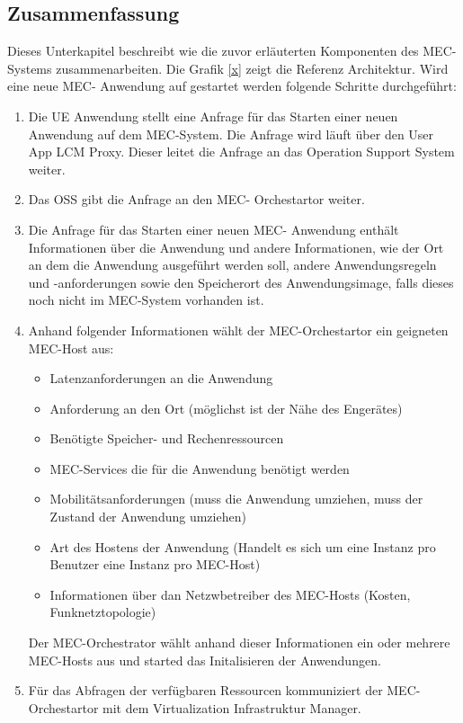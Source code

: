 \documentclass[runningheads]{llncs}
\numberwithin{figure}{section}
\begin{document}
\subsection{Zusammenfassung}
Dieses Unterkapitel beschreibt wie die zuvor erläuterten Komponenten des MEC-Systems zusammenarbeiten. Die Grafik \ref{x} zeigt die 
Referenz Architektur. Wird eine neue MEC- Anwendung auf gestartet werden folgende Schritte durchgeführt:
\begin{enumerate}
  \item Die UE Anwendung stellt eine Anfrage für das Starten einer neuen Anwendung auf dem MEC-System. Die Anfrage wird läuft über den 
  User App LCM Proxy. Dieser leitet die Anfrage an das Operation Support System weiter.
  \item Das OSS gibt die Anfrage an den MEC- Orchestartor weiter.
  \item Die Anfrage für das Starten einer neuen MEC- Anwendung enthält Informationen über 
  die Anwendung und andere Informationen, wie der Ort an dem die Anwendung ausgeführt werden soll, 
  andere Anwendungsregeln und -anforderungen sowie den Speicherort des Anwendungsimage, 
  falls dieses noch nicht im MEC-System vorhanden ist. 
  \item Anhand folgender Informationen wählt der MEC-Orchestartor ein geigneten MEC-Host aus:
  \begin{itemize}
    \item Latenzanforderungen an die Anwendung
    \item Anforderung an den Ort (möglichst ist der Nähe des Engerätes)
    \item Benötigte Speicher- und Rechenressourcen
    \item MEC-Services die für die Anwendung benötigt werden
    \item Mobilitätsanforderungen (muss die Anwendung umziehen, muss der Zustand der Anwendung umziehen)
    \item Art des Hostens der Anwendung (Handelt es sich um eine Instanz pro Benutzer eine Instanz pro MEC-Host)
    \item Informationen über dan Netzwbetreiber des MEC-Hosts (Kosten, Funknetztopologie)
  \end{itemize}
  Der MEC-Orchestrator wählt anhand dieser Informationen ein oder mehrere MEC-Hosts aus und started das Initalisieren der Anwendungen.
  \item Für das Abfragen der verfügbaren Ressourcen kommuniziert der MEC-Orchestartor mit dem Virtualization Infrastruktur Manager.

\end{enumerate}
\end{document}
